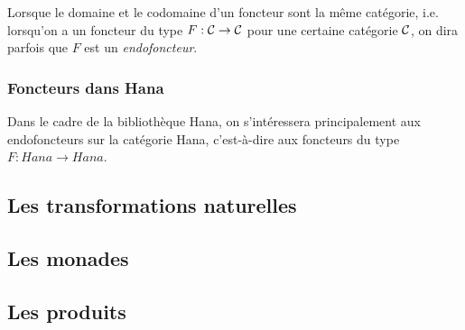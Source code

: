 Lorsque le domaine et le codomaine d'un foncteur sont la même catégorie, i.e.
lorsqu'on a un foncteur du type $F : \mathcal{C} \to \mathcal{C}$ pour une certaine catégorie
$\mathcal{C}$, on dira parfois que $F$ est un \textit{endofoncteur}.


\subsubsection{Foncteurs dans Hana}
Dans le cadre de la bibliothèque Hana, on s'intéressera principalement aux
endofoncteurs sur la catégorie Hana, c'est-à-dire aux foncteurs du type
$F : Hana \to Hana$.

\subsection{Les transformations naturelles}
\subsection{Les monades}
\subsection{Les produits}
